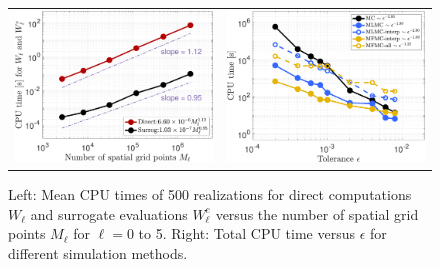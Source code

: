 
%
\begin{figure}[ht!]\centering
\begin{tabular}{cc}
\includegraphics[height=0.36\linewidth]{./figures/CostPerSample_Ml.pdf}&
\includegraphics[height=0.36\linewidth]{./figures/Cost_epsilon.pdf}
\end{tabular}
\caption{Left: Mean CPU times of 500 realizations for direct computations $W_\ell$ and surrogate evaluations $W_\ell^e$ versus the number of spatial grid points $M_\ell$ for $\ell = 0$ to 5. Right: Total CPU time versus $\epsilon$ for different simulation methods.}
\label{fig:CostEstimatePlot}
\end{figure}
%




